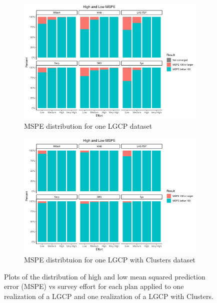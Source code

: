\documentclass[review]{elsarticle}
\begin{document}
\begin{figure}

\begin{subfigure}{5in}
\includegraphics[width=5in]{../graphics/HighMSPE-LGCP000004.png}
\caption{MSPE distribution for one LGCP dataset}
\label{highmspelgcp}
\end{subfigure}

\begin{subfigure}{5in}
\includegraphics[width=5in]{../graphics/HighMSPE-Cluster000004.png}
\caption{MSPE distribtuion for one LGCP with Clusters dataset}
\label{highmspecluster}
\end{subfigure}

\caption{Plots of the distribution of high and low mean squared prediction
error (MSPE) vs survey effort for each plan applied to one realization of a
LGCP and one realization of a LGCP with Clusters.}
\label{histmsperesults}
\end{figure}
\end{document}
